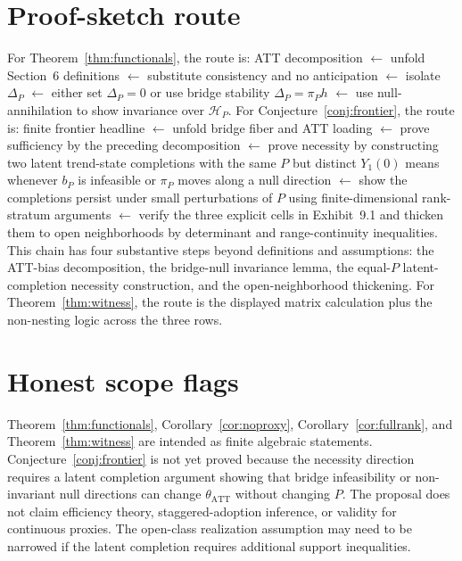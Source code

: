 \documentclass[11pt]{article}
\theoremstyle{definition}
\theoremstyle{plain}
\theoremstyle{remark}
\begin{document}
\section{Proof-sketch route}
For Theorem~\ref{thm:functionals}, the route is: ATT decomposition \(\leftarrow\) unfold Section~6 definitions \(\leftarrow\) substitute consistency and no anticipation \(\leftarrow\) isolate \(\Delta_P\) \(\leftarrow\) either set \(\Delta_P=0\) or use bridge stability \(\Delta_P=\pi_Ph\) \(\leftarrow\) use null-annihilation to show invariance over \(\mathcal H_P\).  For Conjecture~\ref{conj:frontier}, the route is: finite frontier headline \(\leftarrow\) unfold bridge fiber and ATT loading \(\leftarrow\) prove sufficiency by the preceding decomposition \(\leftarrow\) prove necessity by constructing two latent trend-state completions with the same \(P\) but distinct \(Y_1(0)\) means whenever \(b_P\) is infeasible or \(\pi_P\) moves along a null direction \(\leftarrow\) show the completions persist under small perturbations of \(P\) using finite-dimensional rank-stratum arguments \(\leftarrow\) verify the three explicit cells in Exhibit~9.1 and thicken them to open neighborhoods by determinant and range-continuity inequalities.  This chain has four substantive steps beyond definitions and assumptions: the ATT-bias decomposition, the bridge-null invariance lemma, the equal-\(P\) latent-completion necessity construction, and the open-neighborhood thickening.  For Theorem~\ref{thm:witness}, the route is the displayed matrix calculation plus the non-nesting logic across the three rows.

\section{Honest scope flags}
Theorem~\ref{thm:functionals}, Corollary~\ref{cor:noproxy}, Corollary~\ref{cor:fullrank}, and Theorem~\ref{thm:witness} are intended as finite algebraic statements.  Conjecture~\ref{conj:frontier} is not yet proved because the necessity direction requires a latent completion argument showing that bridge infeasibility or non-invariant null directions can change \(\theta_{\mathrm{ATT}}\) without changing \(P\).  The proposal does not claim efficiency theory, staggered-adoption inference, or validity for continuous proxies.  The open-class realization assumption may need to be narrowed if the latent completion requires additional support inequalities.
\end{document}
